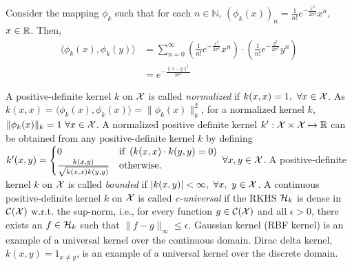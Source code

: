 \begin{example}
Consider the mapping $\phi_k$ such that for each $n\in \mathbb{N}$, $\left(\phi_k(x)\right)_n = \frac{1}{n!}e^{-\frac{x^2}{2\sigma^2}}x^n$, $x\in \mathbb{R}$. Then, 
\begin{align*}
    \langle\phi_k(x), \phi_k(y)\rangle &= \sum_{n=0}^\infty \left(\frac{1}{n!}e^{-\frac{x^2}{2\sigma^2}}x^n\right)\cdot \left(\frac{1}{n!}e^{-\frac{y^2}{2\sigma^2}}y^n\right)\\
    &=e^{-\frac{\|x-y\|^2}{2\sigma^2}} \tag{Gaussian/RBF kernel.}
\end{align*}
\end{example}
A positive-definite kernel $k$ on $\mathcal{X}$ is called \textit{normalized} if $k(x,x)=1,\ \forall x \in \mathcal{X}$. As $k(x, x)=\langle \phi_k(x), \phi_k(x) \rangle=\|\phi_k(x)\|_k^2$, for a normalized kernel $k$, $\|\phi_k(x)\|_k=1\ \forall x\in \mathcal{X}$. A normalized positive definite kernel $k':\mathcal{X}\times \mathcal{X} \mapsto \mathbb{R}$ can be obtained from any positive-definite kernel $k$ by defining $k'(x, y) = \begin{cases}
0 & \textup{if }\left(k(x, x)\cdot k(y, y)=0\right)\\
\frac{k(x, y)}{\sqrt{k(x, x)k(y, y)}} & \textup{otherwise}.
\end{cases}$ $ \forall x, y\in \mathcal{X}$.
A positive-definite kernel $k$ on $\mathcal{X}$ is called \textit{bounded} if $|k(x, y)|<\infty,\ \forall x,\ y\in \mathcal{X}$.
A continuous positive-definite kernel $k$ on $\mathcal{X}$ is called \textit{c-universal} if the RKHS $\mathcal{H}_k$ is dense in $\mathcal{C}(\mathcal{X})$ w.r.t. the sup-norm, i.e., for every function $g \in \mathcal{C}(\mathcal{X})$ and all $\epsilon>0$, there exists an $f\in\mathcal{H}_k$ such that $\|f-g\|_\infty\leq \epsilon$. Gaussian kernel (RBF kernel) is an example of a universal kernel over the continuous domain. Dirac delta kernel, $k(x, y)=1_{x\neq y}$, is an example of a universal kernel over the discrete domain.

